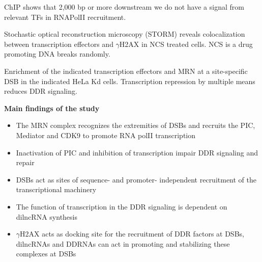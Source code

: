 ChIP shows that 2,000 bp or more downstream we do not have a signal from relevant TFs in RNAPolII recruitment.

Stochastic optical reconstruction microscopy (STORM) reveals colocalization between transcription effectors and \(\gamma\)H2AX in NCS treated cells. NCS is a drug promoting DNA breaks randomly.

Enrichment of the indicated transcription effectors and MRN at a site-specific DSB in the indicated HeLa Kd cells. Transcription repression by multiple means reduces DDR signaling.

\textbf{Main findings of the study}

\begin{itemize}
\tightlist
\item
  The MRN complex recognizes the extremities of DSBs and recruits the PIC, Mediator and CDK9 to promote RNA polII transcription
\item
  Inactivation of PIC and inhibition of transcription impair DDR signaling and repair
\item
  DSBs act as sites of sequence- and promoter- independent recruitment of the transcriptional machinery
\item
  The function of transcription in the DDR signaling is dependent on dilncRNA synthesis
\item
  \(\gamma\)H2AX acts as docking site for the recruitment of DDR factors at DSBs, dilncRNAs and DDRNAs can act in promoting and stabilizing these complexes at DSBs
\end{itemize}
